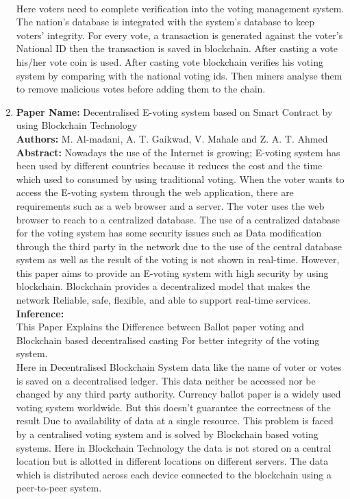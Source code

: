 \documentclass[oneside, 12pt]{book}
\begin{document}
\begin{enumerate}
					\\Here voters need to complete verification into the voting management system. The nation's database is integrated with the system's database to keep voters’ integrity. For every vote, a transaction is generated against the voter’s National ID then the transaction is saved in blockchain. After casting a vote his/her vote coin is used. After casting vote blockchain verifies his voting system by comparing with the national voting ids. Then miners analyse them to remove malicious votes before adding them to the chain.
				\item
					\textbf{Paper Name:} Decentralised E-voting system based on Smart Contract by using Blockchain Technology \cite{al2020decentralized}\\
					\textbf{Authors:} M. Al-madani, A. T. Gaikwad, V. Mahale and Z. A. T. Ahmed\\
					\textbf{Abstract:} Nowadays the use of the Internet is growing; E-voting system has been used by different countries because it reduces the cost and the time which used to consumed by using traditional voting. When the voter wants to access the E-voting system through the web application, there are requirements such as a web browser and a server. The voter uses the web browser to reach to a centralized database. The use of a centralized database for the voting system has some security issues such as Data modification through the third party in the network due to the use of the central database system as well as the result of the voting is not shown in real-time. However, this paper aims to provide an E-voting system with high security by using blockchain. Blockchain provides a decentralized model that makes the network Reliable, safe, flexible, and able to support real-time services.\\
					\textbf{Inference:}
					\\This Paper Explains the Difference between Ballot paper voting and Blockchain based decentralised casting For better integrity of the voting system.
					\\Here in Decentralised Blockchain System data like the name of voter or votes is saved on a decentralised ledger. This data neither be accessed nor be changed by any third party authority. Currency ballot paper is a widely used voting system worldwide. But this doesn't guarantee the correctness of the result Due to availability of data at a single resource. This problem is faced by a centralised voting system and is solved by Blockchain based voting systems. Here in Blockchain Technology the data is not stored on a central location but is allotted in different locations on different servers. The data which is distributed across each device connected to the blockchain using a peer-to-peer system.

\end{enumerate}
\end{document}
